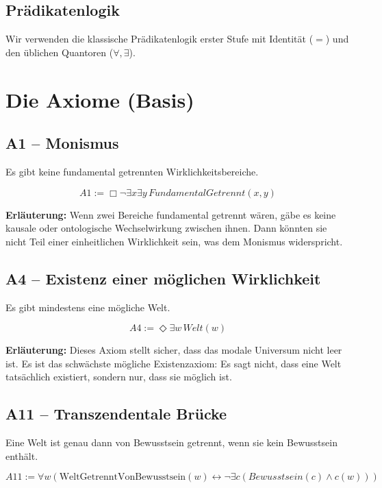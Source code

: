 \documentclass[
]{article}
\begin{document}
\subsection{Prädikatenlogik}

Wir verwenden die klassische Prädikatenlogik erster Stufe mit Identität (\(=\)) und den üblichen Quantoren (\(\forall, \exists\)).

\section{Die Axiome (Basis)}

\subsection{A1 – Monismus}

Es gibt keine fundamental getrennten Wirklichkeitsbereiche.

\[
\boxed{A1 := \Box\neg\exists x\exists y\, FundamentalGetrennt(x,y)}
\]

\textbf{Erläuterung:} Wenn zwei Bereiche fundamental getrennt wären, gäbe es keine kausale oder ontologische Wechselwirkung zwischen ihnen. Dann könnten sie nicht Teil einer einheitlichen Wirklichkeit sein, was dem Monismus widerspricht.

\subsection{A4 – Existenz einer möglichen Wirklichkeit}

Es gibt mindestens eine mögliche Welt.

\[
\boxed{A4 := \Diamond\exists w\, Welt(w)}
\]

\textbf{Erläuterung:} Dieses Axiom stellt sicher, dass das modale Universum nicht leer ist. Es ist das schwächste mögliche Existenzaxiom: Es sagt nicht, dass eine Welt tatsächlich existiert, sondern nur, dass sie möglich ist.

\subsection{A11 – Transzendentale Brücke}

Eine Welt ist genau dann von Bewusstsein getrennt, wenn sie kein Bewusstsein enthält.

\[
\boxed{A11 := \forall w \left( \text{WeltGetrenntVonBewusstsein}(w) \leftrightarrow \neg \exists c (Bewusstsein(c) \land c(w)) \right)}
\]
\end{document}

